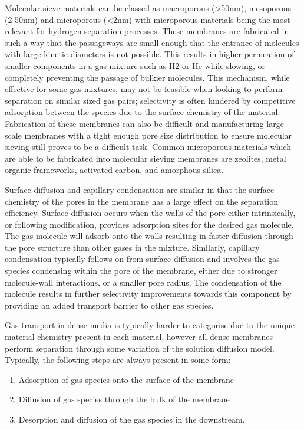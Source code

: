 Molecular sieve materials can be classed as macroporous (>50nm), mesoporous (2-50nm) and microporous (<2nm) 
with microporous materials being the most relevant for hydrogen separation processes. These membranes are 
fabricated in such a way that the passageways are small enough that the entrance of molecules with large 
kinetic diameters is not possible. This results in higher permeation of smaller components in a gas mixture 
such as H2 or He while slowing, or completely preventing the passage of bulkier molecules. This mechanism, 
while effective for some gas mixtures, may not be feasible when looking to perform separation on similar 
sized gas pairs; selectivity is often hindered by competitive adsorption between the species due to the 
surface chemistry of the material. Fabrication of these membranes can also be difficult and manufacturing 
large scale membranes with a tight enough pore size distribution to ensure molecular sieving still proves 
to be a difficult task. Common microporous materials which are able to be fabricated into molecular sieving 
membranes are zeolites, metal organic frameworks, activated carbon, and amorphous silica.

Surface diffusion and capillary condensation are similar in that the surface chemistry of the pores in the 
membrane has a large effect on the separation efficiency. Surface diffusion occurs when the walls of the pore 
either intrinsically, or following modification, provides adsorption sites for the desired gas molecule. 
The gas molecule will adsorb onto the walls resulting in faster diffusion through the pore structure than 
other gases in the mixture. Similarly, capillary condensation typically follows on from surface diffusion 
and involves the gas species condensing within the pore of the membrane, either due to stronger molecule-wall 
interactions, or a smaller pore radius. The condensation of the molecule results in further selectivity 
improvements towards this component by providing an added transport barrier to other gas species. 

Gas transport in dense media is typically harder to categorise due to the unique material chemistry present 
in each material, however all dense membranes perform separation through some variation of the solution 
diffusion model. Typically, the following steps are always present in some form:
\begin{enumerate}
\item Adsorption of gas species onto the surface of the membrane 
\item Diffusion of gas species through the bulk of the membrane 
\item Desorption and diffusion of the gas species in the downstream. 
\end{enumerate}

